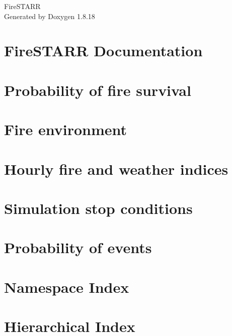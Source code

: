 \let\mypdfximage\pdfximage\def\pdfximage{\immediate\mypdfximage}\documentclass[twoside]{book}
\newcommand{\+}{\discretionary{\mbox{\scriptsize$\hookleftarrow$}}{}{}}
\newcommand{\clearemptydoublepage}{%
  \newpage{\pagestyle{empty}\cleardoublepage}%
}
\begin{document}
\hypersetup{pageanchor=false,
             bookmarksnumbered=true,
             pdfencoding=unicode
            }
\begin{titlepage}
\vspace*{7cm}
\begin{center}%
{\Large Fire\+S\+T\+A\+RR }\\
\vspace*{1cm}
{\large Generated by Doxygen 1.8.18}\\
\end{center}
\end{titlepage}
\clearemptydoublepage
{}
\tableofcontents
\clearemptydoublepage
{}
\hypersetup{pageanchor=true}

\chapter{Fire\+S\+T\+A\+RR Documentation}
\label{index}\hypertarget{index}{}
\chapter{Probability of fire survival}
\label{survival}

\chapter{Fire environment}
\label{environment}

\chapter{Hourly fire and weather indices}
\label{weather}

\chapter{Simulation stop conditions}
\label{ending}

\chapter{Probability of events}
\label{probability}

\chapter{Namespace Index}

\chapter{Hierarchical Index}

\end{document}
